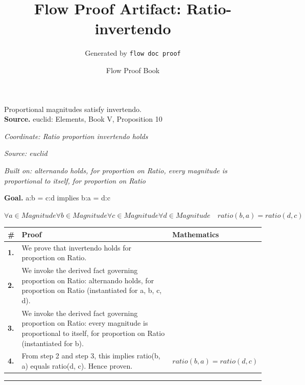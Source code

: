 \documentclass[11pt]{article}
\title{Flow Proof Artifact: Ratio-invertendo}
\author{Generated by \texttt{flow doc proof}}
\date{Flow Proof Book}
\theoremstyle{definition}
\begin{document}
\maketitle
Proportional magnitudes satisfy invertendo.\\[0.5em]
\textbf{Source.} euclid: Elements, Book V, Proposition 10\\[0.5em]
\bigskip
{}\par
\smallskip\noindent\textit{Coordinate: Ratio \cdot proportion \cdot invertendo holds}\par
\smallskip\noindent\textit{Source: euclid}\par
\smallskip\noindent\textit{Built on: alternando holds, for proportion on Ratio, every magnitude is proportional to itself, for proportion on Ratio}\par
\medskip
\noindent\textbf{Goal.} a:b = c:d implies b:a = d:c\par
\noindent$\displaystyle \forall a \in Magnitude \forall b \in Magnitude \forall c \in Magnitude \forall d \in Magnitude\quad ratio(b, a) = ratio(d, c)$\par
\medskip
\noindent
\begin{tabular}{@{} >{\raggedright\arraybackslash}p{} >{\raggedright\arraybackslash}p{} >{\raggedleft\arraybackslash}p{} @{}}
\textbf{\#} & \textbf{Proof} & \textbf{Mathematics} \\
\midrule
\textbf{1.} & We prove that invertendo holds for proportion on Ratio. & \\[0.45em]
\textbf{2.} & We invoke the derived fact governing proportion on Ratio: alternando holds, for proportion on Ratio (instantiated for a, b, c, d). & \\[0.45em]
\textbf{3.} & We invoke the derived fact governing proportion on Ratio: every magnitude is proportional to itself, for proportion on Ratio (instantiated for b). & \\[0.45em]
\textbf{4.} & From step 2 and step 3, this implies ratio(b, a) equals ratio(d, c). Hence proven. & $\displaystyle ratio(b, a) = ratio(d, c)$ \\[0.45em]
\bottomrule
\end{tabular}
\label{thm:Ratio-proportion-invertendo_holds}
\par\medskip\hrule
\end{document}

